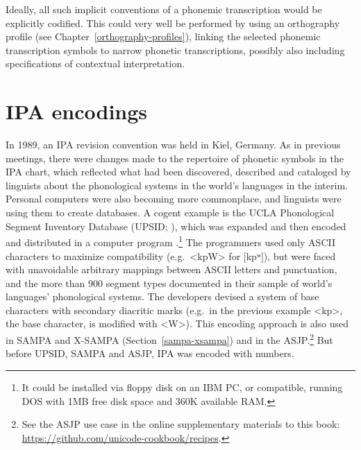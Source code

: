 Ideally, all such implicit conventions of a phonemic transcription would be
explicitly codified. This could very well be performed by using an orthography
profile (see Chapter~\ref{orthography-profiles}), linking the selected phonemic 
transcription symbols to narrow phonetic transcriptions, possibly also including 
specifications of contextual interpretation.


\section{IPA encodings}
\label{EncodingIPA}

In 1989, an IPA revision convention was held in Kiel, Germany. As in previous meetings, 
there were changes made to the repertoire of phonetic symbols in the IPA chart, which 
reflected what had been discovered, described and cataloged by linguists about the 
phonological systems in the world's languages in the interim. Personal computers 
were also becoming more commonplace, and linguists were using them to create databases. 
A cogent example is the UCLA Phonological 
Segment Inventory Database (UPSID; \citealt{Maddieson1984}), which was expanded 
\citep{MaddiesonPrecoda1990} and then encoded and distributed in a computer program 
\citep{MaddiesonPrecoda1992}.\footnote{It could be installed via 
floppy disk on an IBM PC, or compatible, running 
DOS with 1MB free disk space and 360K available RAM.} The programmers used 
only ASCII characters to maximize compatibility (e.g.\ <kpW> for $[$kpʷ$]$), but 
were faced with unavoidable arbitrary mappings between ASCII letters and 
punctuation, and the more than 900 segment types documented 
in their sample of world's languages' phonological systems. The developers 
devised a system of base characters with secondary diacritic marks 
(e.g.\ in the previous example <kp>, the base character, is modified with <W>). 
This encoding approach is 
also used in SAMPA and X-SAMPA (Section~\ref{sampa-xsampa}) and in the 
ASJP.\footnote{See the ASJP use case in the online supplementary 
materials to this book: \url{https://github.com/unicode-cookbook/recipes}.} 
But before UPSID, SAMPA and ASJP, IPA was encoded with numbers.
 

